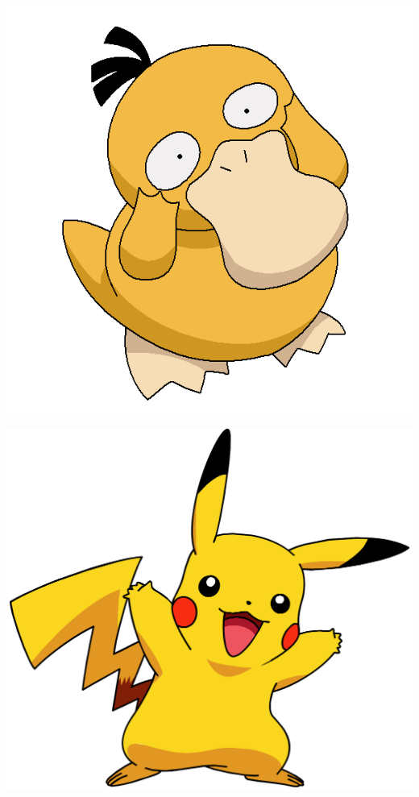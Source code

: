 \begin{minipage}{0.45\textwidth}
\includegraphics[scale = 0.42]{../Images/Psykokwak.png}
\end{minipage}
\begin{minipage}{0.45\textwidth}
\includegraphics[scale = 0.26]{../Images/Pikachu.png}
\end{minipage}